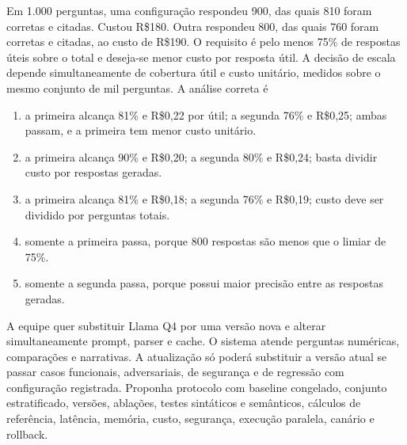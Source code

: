 \documentclass[12pt,a4paper]{article}
\begin{document}
\TextoBase
Em 1.000 perguntas, uma configuração respondeu 900, das quais 810 foram corretas e citadas. Custou R\$180. Outra respondeu 800, das quais 760 foram corretas e citadas, ao custo de R\$190. O requisito é pelo menos 75\% de respostas úteis sobre o total e deseja-se menor custo por resposta útil.
A decisão de escala depende simultaneamente de cobertura útil e custo unitário, medidos sobre o mesmo conjunto de mil perguntas.
\FonteDidatica
\Comando A análise correta é
\begin{enumerate}[label=\Alph*)]
  \item a primeira alcança 81\% e R\$0,22 por útil; a segunda 76\% e R\$0,25; ambas passam, e a primeira tem menor custo unitário.
  \item a primeira alcança 90\% e R\$0,20; a segunda 80\% e R\$0,24; basta dividir custo por respostas geradas.
  \item a primeira alcança 81\% e R\$0,18; a segunda 76\% e R\$0,19; custo deve ser dividido por perguntas totais.
  \item somente a primeira passa, porque 800 respostas são menos que o limiar de 75\%.
  \item somente a segunda passa, porque possui maior precisão entre as respostas geradas.
\end{enumerate}

\TextoBase
A equipe quer substituir Llama Q4 por uma versão nova e alterar simultaneamente prompt, parser e cache. O sistema atende perguntas numéricas, comparações e narrativas.
A atualização só poderá substituir a versão atual se passar casos funcionais, adversariais, de segurança e de regressão com configuração registrada.
\FonteDidatica
\Comando Proponha protocolo com baseline congelado, conjunto estratificado, versões, ablações, testes sintáticos e semânticos, cálculos de referência, latência, memória, custo, segurança, execução paralela, canário e rollback.
\EspacoDiscursiva


\TextoBase
\end{document}
